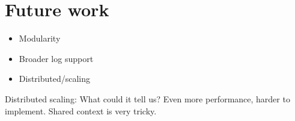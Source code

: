 \section{Future work}
\label{sec:futurework}

\begin{itemize}
    \item Modularity
    \item Broader log support
    \item Distributed/scaling
\end{itemize}

Distributed scaling: What could it tell us? Even more performance, harder to implement. Shared context is very tricky.

